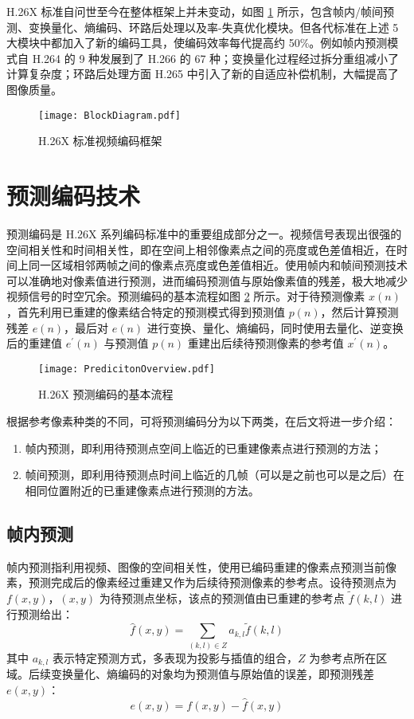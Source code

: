 H.26X 标准自问世至今在整体框架上并未变动，如图 \ref{fig:BlockDiagram} 所示，包含帧内/帧间预测、变换量化、熵编码、环路后处理以及率-失真优化模块。但各代标准在上述 5 大模块中都加入了新的编码工具，使编码效率每代提高约 50\%。例如帧内预测模式自 H.264 的 9 种发展到了 H.266 的 67 种；变换量化过程经过拆分重组减小了计算复杂度；环路后处理方面 H.265 中引入了新的自适应补偿机制，大幅提高了图像质量。
\begin{figure}[hbt]
    \centering
    \texttt{[image: BlockDiagram.pdf]}
    \caption{H.26X 标准视频编码框架}
    \label{fig:BlockDiagram}
\end{figure}

\section{预测编码技术}
预测编码是 H.26X 系列编码标准中的重要组成部分之一。视频信号表现出很强的空间相关性和时间相关性，即在空间上相邻像素点之间的亮度或色差值相近，在时间上同一区域相邻两帧之间的像素点亮度或色差值相近。使用帧内和帧间预测技术可以准确地对像素值进行预测，进而编码预测值与原始像素值的残差，极大地减少视频信号的时空冗余。预测编码的基本流程如图 \ref{fig:PredicitonOverview} 所示。对于待预测像素 $x(n)$，首先利用已重建的像素结合特定的预测模式得到预测值 $p(n)$，然后计算预测残差 $e(n)$，最后对 $e(n)$ 进行变换、量化、熵编码，同时使用去量化、逆变换后的重建值 $e^{'}(n)$ 与预测值 $p(n)$ 重建出后续待预测像素的参考值 $x^{'}(n)$。
\begin{figure}[hbt]
    \centering
    \texttt{[image: PredicitonOverview.pdf]}
    \caption{H.26X 预测编码的基本流程}
    \label{fig:PredicitonOverview}
\end{figure}

根据参考像素种类的不同，可将预测编码分为以下两类，在后文将进一步介绍：
\begin{enumerate}
    \item 帧内预测，即利用待预测点空间上临近的已重建像素点进行预测的方法；
    \item 帧间预测，即利用待预测点时间上临近的几帧（可以是之前也可以是之后）在相同位置附近的已重建像素点进行预测的方法。
\end{enumerate}

\subsection{帧内预测}
帧内预测指利用视频、图像的空间相关性，使用已编码重建的像素点预测当前像素，预测完成后的像素经过重建又作为后续待预测像素的参考点。设待预测点为 $f(x,y)$，$(x,y)$ 为待预测点坐标，该点的预测值由已重建的参考点 $\widetilde{f}(k,l)$ 进行预测给出：
\begin{equation}
    \widehat{f}(x,y) = \sum_{(k,l)\in Z}a_{k,l}\widetilde{f}(k,l)
\end{equation}
其中 $a_{k,l}$ 表示特定预测方式，多表现为投影与插值的组合，$Z$ 为参考点所在区域。后续变换量化、熵编码的对象均为预测值与原始值的误差，即预测残差 $e(x,y)$：
\begin{equation}
    e(x,y) = f(x,y) - \widehat{f}(x,y)
\end{equation}

